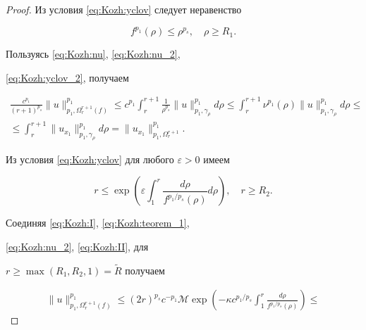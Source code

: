 \smallskip



\begin{proof}

Из условия \eqref{eq:Kozh:yclov} следует неравенство

\begin{equation}

f^{p_1}(\rho)\leq\rho^{p_s}, \quad \rho\geq R_1.\label{eq:Kozh:yclov_2}

\end{equation}

Пользуясь \eqref{eq:Kozh:nu}, \eqref{eq:Kozh:nu_2},

\eqref{eq:Kozh:yclov_2}, получаем

\begin{multline}

\frac{c^{p_1}}{(r+1)^{p_s}}\|u\|^{p_1}_{p_1,\Omega^{r+1}_{r}(f)}\leq

c^{p_1}\int _{r}^{r+1}\frac{1}{\rho^{p_s}}\|u\|^{p_1}_{p_1,\gamma_\rho}

d\rho\leq\int _{r}^{r+1}\nu^{p_1}(\rho)

\|u\|^{p_1}_{p_1,\gamma_\rho}d\rho\leq\\

\leq\int _{r}^{r+1}\|u_{x_1}\|^{p_1}_{p_1,\gamma_\rho}d\rho=\|u_{x_1}\|^{p_1}_{p_1,\Omega_r^{r+1}}.

\label{eq:Kozh:I}

\end{multline}



Из условия \eqref{eq:Kozh:yclov} для любого $\varepsilon>0$ имеем

\begin{equation}

r\leq\exp\left(\varepsilon\int _1^r\frac{d\rho}{f^{p_1/p_s}(\rho)}d\rho\right), \quad r\geq R_2.\label{eq:Kozh:II}

\end{equation}

Соединяя \eqref{eq:Kozh:I}, \eqref{eq:Kozh:teorem_1},

\eqref{eq:Kozh:nu_2}, \eqref{eq:Kozh:II}, для

$r\geq\max(R_1,R_2,1)=\widetilde{R}$ получаем

\begin{multline*}

\|u\|^{p_1}_{p_1,\Omega_r^{r+1}(f)}\leq(2r)^{p_s}c^{-p_1}\mathcal{M}\exp\left(-\kappa

c^{p_1/p_s}\int _{1}^r\frac{d\rho}{f^{p_1/p_s}(\rho)}\right)\leq


\end{multline*}
\end{proof}
